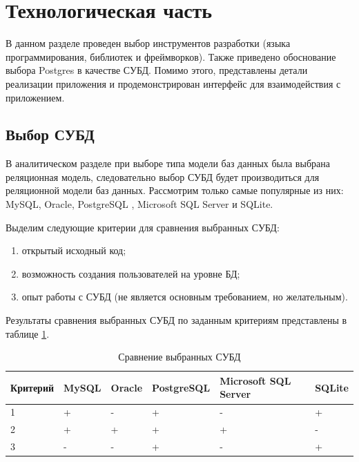 \section{Технологическая часть}

В данном разделе проведен выбор инструментов разработки (языка программирования, библиотек и фреймворков). 
Также приведено обоснование выбора Postgres в качестве СУБД. 
Помимо этого, представлены детали реализации приложения и продемонстрирован интерфейс для взаимодействия с приложением.

\subsection{Выбор СУБД}

В аналитическом разделе при выборе типа модели баз данных была выбрана реляционная модель, следовательно выбор СУБД будет производиться для реляционной модели баз данных. Рассмотрим только самые популярные из них: MySQL, Oracle, PostgreSQL \cite{postgres}, Microsoft SQL Server и SQLite.

Выделим следующие критерии для сравнения выбранных СУБД:

\begin{enumerate}
	\item открытый исходный код;
	\item возможность создания пользователей на уровне БД;
	\item опыт работы с СУБД (не является основным требованием, но желательным).
\end{enumerate}

Результаты сравнения выбранных СУБД по заданным критериям представлены в таблице \ref{tbl:compare_DBMS}.


\begin{table}[ht!]
	\centering
	\caption{Сравнение выбранных СУБД}
	\label{tbl:compare_DBMS}
	\begin{tabular}{|l|l|l|l|l|l|}
		\hline
		\textbf{Критерий} & \textbf{MySQL} & \textbf{Oracle} & \textbf{PostgreSQL} & \textbf{Microsoft SQL Server} & \textbf{SQLite} \\ \hline
		
		1 & + & - & + & - & + \\ \hline
		2 & + & + & + & + & - \\ \hline
		3 & - & - & + & - & + \\ \hline
		
	\end{tabular}
\end{table}

